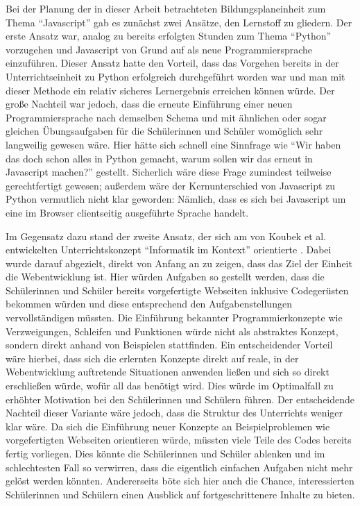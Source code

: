 Bei der Planung der in dieser Arbeit betrachteten Bildungsplaneinheit zum Thema ``Javascript'' gab es zunächst zwei Ansätze, den Lernstoff zu gliedern.
Der erste Ansatz war, analog zu bereits erfolgten Stunden zum Thema ``Python'' vorzugehen und Javascript von Grund auf als neue Programmiersprache einzuführen.
Dieser Ansatz hatte den Vorteil, dass das Vorgehen bereits in der Unterrichtseinheit zu Python erfolgreich durchgeführt worden war und man mit dieser Methode ein relativ sicheres Lernergebnis erreichen können würde.
Der große Nachteil war jedoch, dass die erneute Einführung einer neuen Programmiersprache nach demselben Schema und mit ähnlichen oder sogar gleichen Übungsaufgaben für die Schülerinnen und Schüler womöglich sehr langweilig gewesen wäre.
Hier hätte sich schnell eine Sinnfrage wie ``Wir haben das doch schon alles in Python gemacht, warum sollen wir das erneut in Javascript machen?'' gestellt.
Sicherlich wäre diese Frage zumindest teilweise gerechtfertigt gewesen; außerdem wäre der Kernunterschied von Javascript zu Python vermutlich nicht klar geworden:
Nämlich, dass es sich bei Javascript um eine im Browser clientseitig ausgeführte Sprache handelt.

Im Gegensatz dazu stand der zweite Ansatz, der sich am von Koubek et al. entwickelten Unterrichtskonzept ``Informatik im Kontext'' orientierte \cite{koubek2009informatik}.
Dabei wurde darauf abgezielt, direkt von Anfang an zu zeigen, dass das Ziel der Einheit die Webentwicklung ist.
Hier würden Aufgaben so gestellt werden, dass die Schülerinnen und Schüler bereits vorgefertigte Webseiten inklusive Codegerüsten bekommen würden und diese entsprechend den Aufgabenstellungen vervollständigen müssten.
Die Einführung bekannter Programmierkonzepte wie Verzweigungen, Schleifen und Funktionen würde nicht als abstraktes Konzept, sondern direkt anhand von Beispielen stattfinden.
Ein entscheidender Vorteil wäre hierbei, dass sich die erlernten Konzepte direkt auf reale, in der Webentwicklung auftretende Situationen anwenden ließen und sich so direkt erschließen würde, wofür all das benötigt wird.
Dies würde im Optimalfall zu erhöhter Motivation bei den Schülerinnen und Schülern führen.
Der entscheidende Nachteil dieser Variante wäre jedoch, dass die Struktur des Unterrichts weniger klar wäre.
Da sich die Einführung neuer Konzepte an Beispielproblemen wie vorgefertigten Webseiten orientieren würde, müssten viele Teile des Codes bereits fertig vorliegen.
Dies könnte die Schülerinnen und Schüler ablenken und im schlechtesten Fall so verwirren, dass die eigentlich einfachen Aufgaben nicht mehr gelöst werden könnten.
Andererseits böte sich hier auch die Chance, interessierten Schülerinnen und Schülern einen Ausblick auf fortgeschrittenere Inhalte zu bieten.


